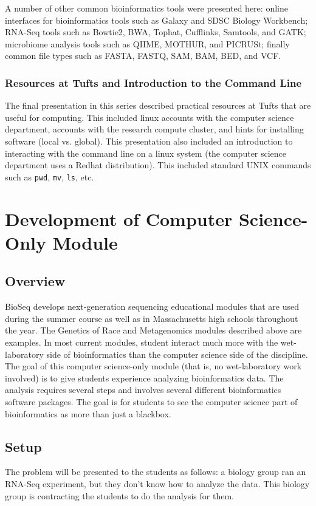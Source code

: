 \documentclass{report}
\begin{document}
A number of other common bioinformatics tools were presented here: online interfaces for bioinformatics tools such as Galaxy and SDSC Biology Workbench; RNA-Seq tools such as Bowtie2, BWA, Tophat, Cufflinks, Samtools, and GATK; microbiome analysis tools such as QIIME, MOTHUR, and PICRUSt; finally common file types such as FASTA, FASTQ, SAM, BAM, BED, and VCF.

\subsection{Resources at Tufts and Introduction to the Command Line}
The final presentation in this series described practical resources at Tufts that are useful for computing. This included linux accounts with the computer science department, accounts with the research compute cluster, and hints for installing software (local vs. global). This presentation also included an introduction to interacting with the command line on a linux system (the computer science department uses a Redhat distribution). This included standard UNIX commands such as \texttt{pwd}, \texttt{mv}, \texttt{ls}, etc.


\chapter{Development of Computer Science-Only Module}
\section{Overview}
BioSeq develops next-generation sequencing educational modules that are used during the summer course as well as in  Massachusetts high schools throughout the year. The Genetics of Race and Metagenomics modules described above are examples. In most current modules, student interact much more with the wet-laboratory side of bioinformatics than the computer science side of the discipline. The goal of this computer science-only module (that is, no wet-laboratory work involved) is to give students experience analyzing bioinformatics data. The analysis requires several steps and involves several different bioinformatics software packages. The goal is for students to see the computer science part of bioinformatics as more than just a blackbox.

\section{Setup}
The problem will be presented to the students as follows: a biology group ran an RNA-Seq experiment, but they don't know how to analyze the data. This biology group is contracting the students to do the analysis for them. 
\end{document}
